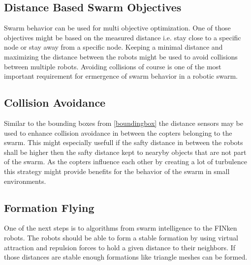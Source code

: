 \subsection{Distance Based Swarm Objectives}
Swarm behavior can be used for multi objective optimization.
One of those objectives might be based on the measured distance i.e. stay close to a specific node or stay away from a specific node.
Keeping a minimal distance and maximizing the distance between the robots might be used to avoid collisions between multiple robots.
Avoiding collisions of course is one of the most important requirement for ermergence of swarm behavior in a robotic swarm.

\subsection{Collision Avoidance}
Similar to the bounding boxes from \autoref{boundingbox} the distance sensors may be used to enhance collision avoidance in between the copters belonging to the swarm.
This might especially usefull if the safty distance in between the robots shall be higher then the safty distance kept to nearyby objects that are not part of the swarm.
As the copters influence each other by creating a lot of turbulence this strategy might provide benefits for the behavior of the swarm in small environments.

\subsection{Formation Flying}
One of the next steps is to  algorithms from swarm intelligence to the FINken robots.
The robots should be able to form a stable formation by using virtual attraction and repulsion forces to hold a given distance to their neighbors.
If those distances are stable enough formations like triangle meshes can be formed.

